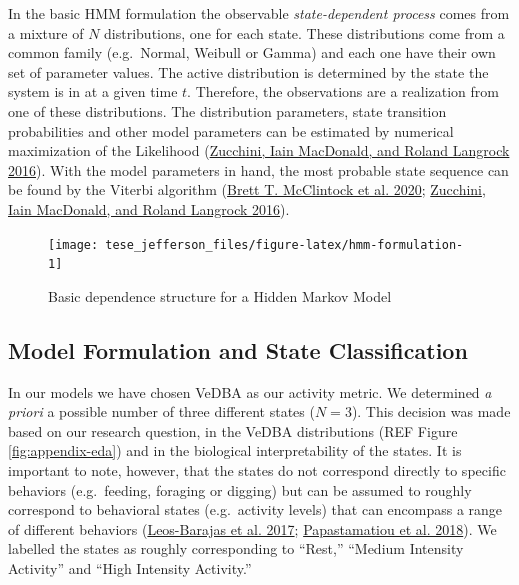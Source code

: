 \documentclass[english,msc,numbers,hidelinks]{coppe}
\begin{document}
  In the basic HMM formulation the observable \emph{state-dependent process} comes from a mixture of \(N\) distributions, one for each state. These distributions come from a common family (e.g.~Normal, Weibull or Gamma) and each one have their own set of parameter values. The active distribution is determined by the state the system is in at a given time \(t\). Therefore, the observations are a realization from one of these distributions. The distribution parameters, state transition probabilities and other model parameters can be estimated by numerical maximization of the Likelihood (\protect\hyperlink{ref-zucchini2016}{Zucchini, Iain MacDonald, and Roland Langrock 2016}). With the model parameters in hand, the most probable state sequence can be found by the Viterbi algorithm (\protect\hyperlink{ref-mcclintock2020}{Brett T. McClintock et al. 2020}; \protect\hyperlink{ref-zucchini2016}{Zucchini, Iain MacDonald, and Roland Langrock 2016}).
  \begin{figure}

  {\centering \texttt{[image: tese\_jefferson\_files/figure-latex/hmm-formulation-1]} 

  }

  \caption{Basic dependence structure for a Hidden Markov Model}\label{fig:hmm-formulation}
  \end{figure}
  \hypertarget{model-formulation-and-state-classification}{%
  \subsection{Model Formulation and State Classification}\label{model-formulation-and-state-classification}}

  In our models we have chosen VeDBA as our activity metric. We determined \emph{a priori} a possible number of three different states (\(N=3\)). This decision was made based on our research question, in the VeDBA distributions (REF Figure \ref{fig:appendix-eda}) and in the biological interpretability of the states. It is important to note, however, that the states do not correspond directly to specific behaviors (e.g.~feeding, foraging or digging) but can be assumed to roughly correspond to behavioral states (e.g.~activity levels) that can encompass a range of different behaviors (\protect\hyperlink{ref-leosbarajas2017}{Leos-Barajas et al. 2017}; \protect\hyperlink{ref-papastamatiou2018}{Papastamatiou et al. 2018}). We labelled the states as roughly corresponding to ``Rest,'' ``Medium Intensity Activity'' and ``High Intensity Activity.''
\end{document}
